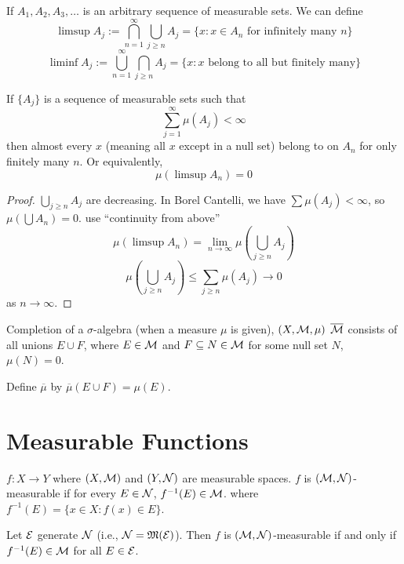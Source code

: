 \begin{definition}
  If $A_1, A_2, A_3, \dotsc$ is an arbitrary sequence of measurable sets. 
  We can define 
  \[\limsup A_j := \bigcap_{n=1}^\infty \bigcup_{j \ge n} A_j = \{x : x \in A_n \text{ for infinitely many }n\}\]
  \[\liminf A_j := \bigcup_{n=1}^\infty \bigcap_{j \ge n} A_j = \{x : x \text{ belong to all but finitely many}\}\]
\end{definition}

\begin{lemma}
  If $\{A_j\}$ is a sequence of measurable sets such that 
  \[\sum_{j=1}^\infty \mu(A_j) < \infty\]
  then almost every $x$ (meaning all $x$ except in a null set) belong to on $A_n$ for only finitely many $n$.
  Or equivalently, 
  \[\mu\left(\limsup A_n\right) = 0\]
\end{lemma}

\begin{proof}
  $\bigcup_{j \ge n} A_j$ are decreasing. In Borel Cantelli, we have $\sum \mu(A_j) < \infty$, so $\mu\left(\bigcup A_n\right) = 0$. 
  use ``continuity from above'' $$\mu(\limsup A_n) = \lim_{n \to \infty} \mu\left(\bigcup_{j \ge n} A_j\right)$$
  \[\mu\left(\bigcup_{j \ge n} A_j\right) \le \sum_{j \ge n} \mu(A_j) \to 0\]
  as $n \to \infty$.
\end{proof}


Completion of a $\sigma$-algebra (when a measure $\mu$ is given), $(X, \mathcal M, \mu)$ $\overline{\mathcal M}$ consists
of all unions $E \cup F$, where $E \in \mathcal M$ and $F \subseteq N \in \mathcal M$ for some null set $N$, $\mu(N) = 0$.

Define $\overline{\mu}$ by $\overline{\mu}(E \cup F) = \mu(E)$.

\section{Measurable Functions}


\begin{definition}
  $f: X \to Y$ where $(X, \mathcal M)$ and $(Y, \mathcal N)$ are measurable spaces.
  $f$ is $(\mathcal M, \mathcal N)$-measurable if for every $E \in \mathcal N$, $f^{-1}(E) \in \mathcal M$.
  where $f^{-1}(E) = \{x \in X : f(x) \in E\}$.
\end{definition}

\begin{lemma}
  Let $\mathcal E$ generate $\mathcal N$ (i.e., $\mathcal N = \mathfrak M(\mathcal E)$). 
  Then $f$ is $(\mathcal M, \mathcal N)$-measurable if and only if $f^{-1}(E) \in \mathcal M$ for all $E \in \mathcal E$. 
\end{lemma}

